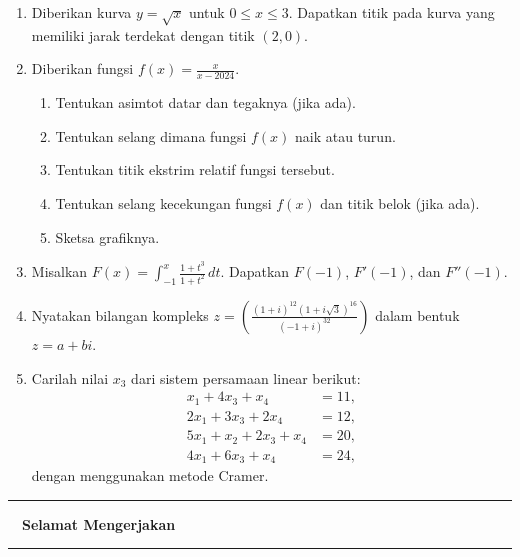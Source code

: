 \documentclass[10pt,openany,a4paper]{article}
\begin{document}
\begin{enumerate}
    \item Diberikan kurva $y = \sqrt{x}$ untuk $0 \leq x \leq 3$. Dapatkan titik pada kurva yang memiliki jarak terdekat dengan titik $(2, 0)$.

    \item Diberikan fungsi $f(x) = \displaystyle\frac{x}{x - 2024}$.
          \begin{enumerate}
              \item Tentukan asimtot datar dan tegaknya (jika ada).
              \item Tentukan selang dimana fungsi $f(x)$ naik atau turun.
              \item Tentukan titik ekstrim relatif fungsi tersebut.
              \item Tentukan selang kecekungan fungsi $f(x)$ dan titik belok (jika ada).
              \item Sketsa grafiknya.
          \end{enumerate}

    \item Misalkan $F(x) = \displaystyle\int_{-1}^x \frac{1 + t^3}{1 + t^2} \, dt$. Dapatkan $F(-1)$, $F'(-1)$, dan $F''(-1)$.

    \item Nyatakan bilangan kompleks $\displaystyle z = \left(\frac{\left(1 + i\right)^{12}\left(1 + i\sqrt{3}\right)^{16}}{(-1 + i)^{32}}\right)$ dalam bentuk $z = a + bi$.

    \item Carilah nilai $x_3$ dari sistem persamaan linear berikut:
          \begin{align*}
              x_1 + 4x_3 + x_4        & = 11, \\
              2x_1 + 3x_3 + 2x_4      & = 12, \\
              5x_1 + x_2 + 2x_3 + x_4 & = 20, \\
              4x_1 + 6x_3 + x_4       & = 24,
          \end{align*}
          dengan menggunakan metode Cramer.
\end{enumerate}
\begin{center}
    \rule{0.28\textwidth}{2.pt}$\quad$\textbf{Selamat Mengerjakan}$\quad$\rule{0.28\textwidth}{2.pt}
\end{center}
\end{document}
